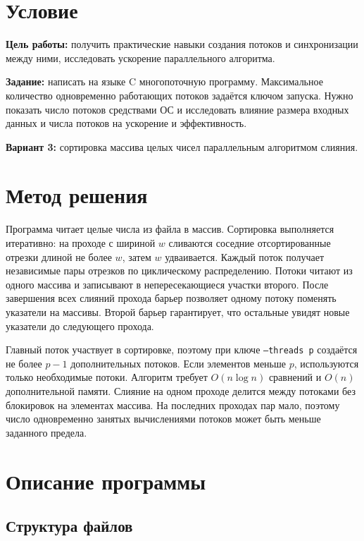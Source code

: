 \documentclass[12pt, a4paper]{article}
\begin{document}


\section{Условие}

\textbf{Цель работы:} получить практические навыки создания потоков и
синхронизации между ними, исследовать ускорение параллельного алгоритма.

\textbf{Задание:} написать на языке C многопоточную программу. Максимальное
количество одновременно работающих потоков задаётся ключом запуска. Нужно
показать число потоков средствами ОС и исследовать влияние размера входных
данных и числа потоков на ускорение и эффективность.

\textbf{Вариант 3:} сортировка массива целых чисел параллельным алгоритмом
слияния.

\section{Метод решения}

Программа читает целые числа из файла в массив. Сортировка выполняется
итеративно: на проходе с шириной $w$ сливаются соседние отсортированные
отрезки длиной не более $w$, затем $w$ удваивается. Каждый поток получает
независимые пары отрезков по циклическому распределению. Потоки читают из
одного массива и записывают в непересекающиеся участки второго. После
завершения всех слияний прохода барьер позволяет одному потоку поменять
указатели на массивы. Второй барьер гарантирует, что остальные увидят
новые указатели до следующего прохода.

Главный поток участвует в сортировке, поэтому при ключе
\texttt{--threads p} создаётся не более $p-1$ дополнительных потоков.
Если элементов меньше $p$, используются только необходимые потоки.
Алгоритм требует $O(n\log n)$ сравнений и $O(n)$ дополнительной памяти.
Слияние на одном проходе делится между потоками без блокировок на элементах
массива. На последних проходах пар мало, поэтому число одновременно
занятых вычислениями потоков может быть меньше заданного предела.

\section{Описание программы}

\subsection{Структура файлов}
\end{document}
